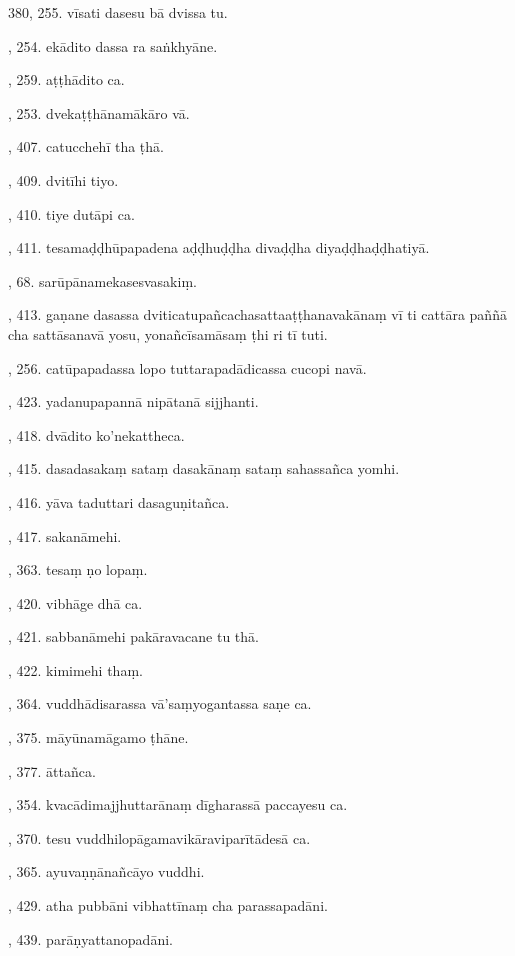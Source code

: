 380, 255. vīsati dasesu bā dvissa tu.\par {}, 254. ekādito dassa ra saṅkhyāne.\par {}, 259. aṭṭhādito ca.\par {}, 253. dvekaṭṭhānamākāro vā.\par {}, 407. catucchehī tha ṭhā.\par {}, 409. dvitīhi tiyo.\par {}, 410. tiye dutāpi ca.\par {}, 411. tesamaḍḍhūpapadena aḍḍhuḍḍha divaḍḍha diyaḍḍhaḍḍhatiyā.\par {}, 68. sarūpānamekasesvasakiṃ.\par {}, 413. gaṇane dasassa dviticatupañcachasattaaṭṭhanavakānaṃ vī ti cattāra paññā cha sattāsanavā yosu, yonañcīsamāsaṃ ṭhi ri tī tuti.\par {}, 256. catūpapadassa lopo tuttarapadādicassa cucopi navā.\par {}, 423. yadanupapannā nipātanā sijjhanti.\par {}, 418. dvādito ko’nekattheca.\par {}, 415. dasadasakaṃ sataṃ dasakānaṃ sataṃ sahassañca yomhi.\par {}, 416. yāva taduttari dasaguṇitañca.\par {}, 417. sakanāmehi.\par {}, 363. tesaṃ ṇo lopaṃ.\par {}, 420. vibhāge dhā ca.\par {}, 421. sabbanāmehi pakāravacane tu thā.\par {}, 422. kimimehi thaṃ.\par {}, 364. vuddhādisarassa vā’saṃyogantassa saṇe ca.\par {}, 375. māyūnamāgamo ṭhāne.\par {}, 377. āttañca.\par {}, 354. kvacādimajjhuttarānaṃ dīgharassā paccayesu ca.\par {}, 370. tesu vuddhilopāgamavikāraviparītādesā ca.\par {}, 365. ayuvaṇṇānañcāyo vuddhi.\par {}, 429. atha pubbāni vibhattīnaṃ cha parassapadāni.\par {}, 439. parāṇyattanopadāni.\par \noindent

